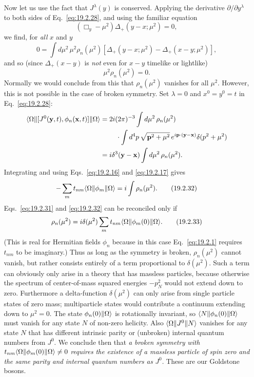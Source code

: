 Now let us use the fact that $J^\lambda(y)$ is conserved. Applying the
derivative $\partial/\partial y^\lambda$ to both sides of
Eq.~\eqref{eq:19.2.28}, and using the familiar equation
\begin{equation}
 (\Box_y-\mu^2)\Delta_+(y-x;\mu^2)=0,
 \tag{19.2.29}\label{eq:19.2.29}
\end{equation}
we find, for \emph{all} $x$ and $y$
\begin{equation}
 0=\int d\mu^2\,\mu^2\rho_n(\mu^2)
 \left[\Delta_+(y-x;\mu^2)-\Delta_+(x-y;\mu^2)\right],
 \tag{19.2.30}\label{eq:19.2.30}
\end{equation}
and so (since $\Delta_+(x-y)$ is \emph{not} even for $x-y$ timelike or
lightlike)
\begin{equation}
 \mu^2\rho_n(\mu^2)=0.
 \tag{19.2.31}\label{eq:19.2.31}
\end{equation}
Normally we would conclude from this that $\rho_n(\mu^2)$ vanishes for all
$\mu^2$. However, this is not possible in the case of broken symmetry. Set
$\lambda=0$ and $x^0=y^0=t$ in Eq.~\eqref{eq:19.2.28}:
\begin{align*}
 \langle \Omega\rVert[J^0(\mathbf y,t),\phi_n(\mathbf x,t)]\lVert \Omega\rangle
 ={}&2i(2\pi)^{-3}\int d\mu^2\,\rho_n(\mu^2)
 \\
 &\quad{}\cdot\int d^4p\,
 \sqrt{\mathbf p^2+\mu^2}\,
 e^{i\mathbf p\cdot(\mathbf y-\mathbf x)}
 \delta(p^2+\mu^2)
 \\
 ={}&i\delta^3(\mathbf y-\mathbf x)
 \int d\mu^2\,\rho_n(\mu^2).
\end{align*}
Integrating and using Eqs.~\eqref{eq:19.2.16} and \eqref{eq:19.2.17} gives
\begin{equation}
 -\sum_m t_{nm}\langle \Omega\rVert\phi_m\lVert \Omega\rangle
 =i\int\rho_n(\mu^2).
 \tag{19.2.32}\label{eq:19.2.32}
\end{equation}
Eqs.~\eqref{eq:19.2.31} and \eqref{eq:19.2.32} can be reconciled only if
\begin{equation}
 \rho_n(\mu^2)=i\delta(\mu^2)
 \sum_m t_{nm}\langle \Omega\rVert\phi_m(0)\lVert \Omega\rangle.
 \tag{19.2.33}\label{eq:19.2.33}
\end{equation}
(This is real for Hermitian fields $\phi_n$ because in this case
Eq.~\eqref{eq:19.2.1} requires $t_{nm}$ to be imaginary.) Thus as long as the
symmetry is broken, $\rho_n(\mu^2)$ cannot vanish, but rather consists
entirely of a term proportional to $\delta(\mu^2)$. Such a term can obviously
only arise in a theory that has massless particles, because otherwise the
spectrum of center-of-mass squared energies $-p_N^2$ would not extend down to
zero. Furthermore a delta-function $\delta(\mu^2)$ can only arise from single
particle states of zero mass; multiparticle states would contribute a
continuum extending down to $\mu^2=0$. The state
$\phi_n(0)\lVert \Omega\rangle$ is rotationally invariant, so
$\langle N\rVert\phi_n(0)\lVert \Omega\rangle$ must vanish for any state $N$ of non-zero
helicity. Also $\langle \Omega\rVert J^0\lVert N\rangle$ vanishes for any state $N$ that has
different intrinsic parity or (unbroken) internal quantum numbers from
$J^0$. We conclude then that \emph{a broken symmetry with
$t_{nm}\langle \Omega\rVert\phi_m(0)\lVert \Omega\rangle\ne0$ requires the existence of a
massless particle of spin zero and the same parity and internal quantum
numbers as $J^0$.} These are our Goldstone bosons.


